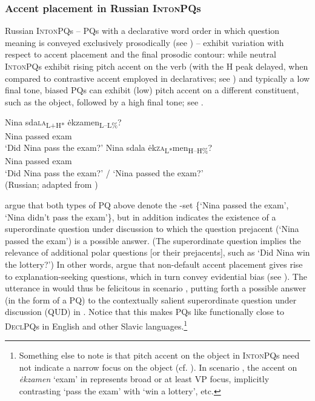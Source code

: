 \documentclass[output=paper,colorlinks,citecolor=brown]{langscibook}
\begin{document}
\subsubsection{Accent placement in Russian \textsc{IntonPQ}s}\label{sim:sec:inton-rus}


Russian \textsc{IntonPQ}s -- PQs with a declarative word order in which question meaning is conveyed exclusively prosodically (see \citealt{Ode1989,Meyer.Mleinek2006}) -- exhibit variation with respect to accent placement and the final prosodic contour: while neutral \textsc{IntonPQ}s exhibit rising pitch accent on the verb (with the H peak delayed, when compared to contrastive accent employed in declaratives; see \citealt{Meyer.Mleinek2006}) and typically a low final tone, biased PQs can exhibit (low) pitch accent on a different constituent, such as the object, followed by a high final tone; see .

\ea\label{sim:ex:accent}\ea\gll Nina sda\textsc{la}\textsubscript{L+H*} \.{e}kzamen\textsubscript{L--L\%}?\label{sim:ex:accent-a}\\
Nina passed exam\\
\glt `Did Nina pass the exam?'
\ex\gll Nina sdala \.{e}k\textsc{za}\textsubscript{L*}men\textsubscript{H--H\%}?\label{sim:ex:accent-b}\\
Nina passed exam\\
\glt `Did Nina pass the exam?' / `Nina passed the exam?'\\\hfill (Russian; adapted from \citealt{Esipova.Romero2023})
\z\z

\noindent\citet{Esipova.Romero2023} argue that both types of PQ above denote the \citeauthor{Hamblin1973}-set \{`Nina passed the exam', `Nina didn't pass the exam'\}, but  in addition indicates the existence of a superordinate question under discussion to which the question prejacent (`Nina passed the exam') is a possible answer. (The superordinate question implies the relevance of additional polar questions [or their prejacents], such as `Did Nina win the lottery?') In other words, \citet{Esipova.Romero2023} argue that non-default accent placement gives rise to explanation-seeking questions, which in turn convey evidential bias (see ). The utterance in  would thus be felicitous in scenario , putting forth a possible answer (in the form of a PQ) to the contextually salient superordinate question under discussion (QUD) in . Notice that this makes PQs like  functionally close to \textsc{DeclPQ}s in English and other Slavic languages.\footnote{Something else to note is that pitch accent on the object in \textsc{IntonPQ}s need not indicate a narrow focus on the object (cf. \citealt{Meyer.Mleinek2006}). In scenario , the accent on \textit{\.{e}kzamen} `exam' in  represents broad or at least VP focus, implicitly contrasting `pass the exam' with `win a lottery', etc.}
\end{document}
